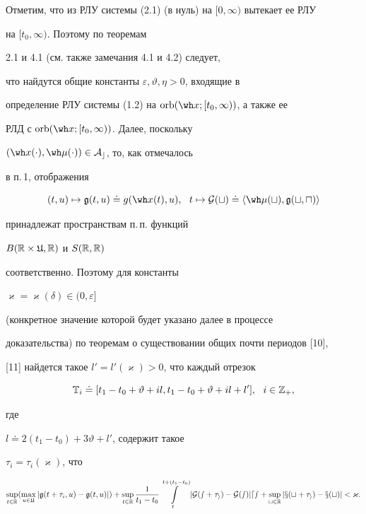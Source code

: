 Отметим, что из РЛУ системы (2.1) (в нуль) на $[0,\infty)$ вытекает ее РЛУ


на $[t_0,\infty)$. Поэтому по теоремам


2.1 и 4.1 (см. также замечания 4.1 и 4.2) следует,


что найдутся общие константы $\varepsilon,\vartheta,\eta>0$, входящие в


определение РЛУ системы (1.2) на $\orb(\wh x;[t_0,\infty ))$, а также ее 


РЛД с $\orb(\wh x;[t_0,\infty))$. Далее, поскольку


$(\wh x(\cdot),\wh\mu(\cdot))\in\cal A_c$, то, как отмечалось


в п.\,1, отображения


\begin{equation}


(t,u)\mapsto\frak g(t,u)\doteq g(\wh x(t),u),


\ \ t\mapsto\cal G(t)\doteq


\langle\wh\mu(t),\frak g(t,u)\rangle


\end{equation}


принадлежат пространствам п.\,п. функций


$B(\Bbb R\times\frak U,\Bbb R)$ и $S(\Bbb R,\Bbb R)$


соответственно. Поэтому для константы


$\varkappa=\varkappa(\delta)\in(0,\varepsilon]$


(конкретное значение которой будет указано далее в процессе


доказательства) по теоремам о существовании общих почти периодов [10],


[11] найдется такое $l'=l'(\varkappa)>0$, что каждый отрезок


$$


\bT_{i}\doteq[t_1-t_0+\vartheta +il,t_1-t_0+\vartheta+il+l'],


\ \ i\in\Bbb Z_+,


$$


где


$l\doteq2(t_1-t_0)+3\vartheta +l'$, содержит такое 


$\tau_i=\tau_i({\varkappa})$, что


\begin{equation}


\sup_{t\in\bR}(\max_{u\in\frak U}


|\frak g(t+\tau_i,u)-\frak g(t,u)|)+


\sup_{t\in\bR}\frac{1}{t_1-t_0}


\int\limits_t^{t+(t_1-t_0)}


|\cal G(s+\tau_i)-\cal G(s)|ds


+\sup_{t\in\bR}|x(t+\tau_i)-x(t)|<{\varkappa}.


\end{equation}





